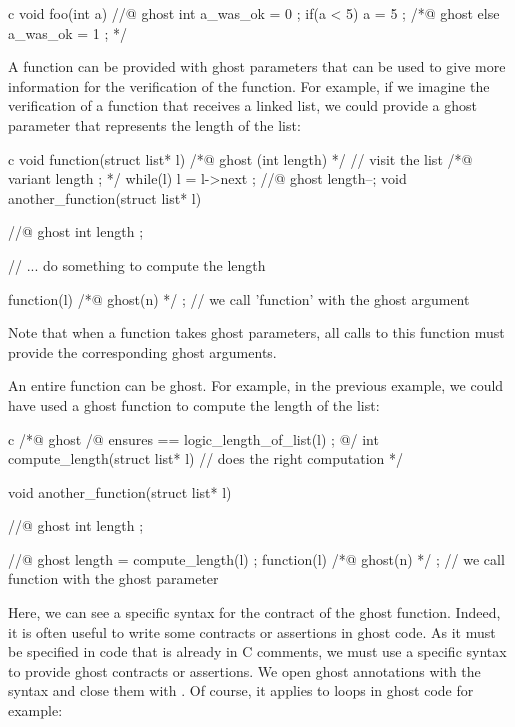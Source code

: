 \begin{CodeBlock}{c}
void foo(int a){
  //@ ghost int a_was_ok = 0 ;
  if(a < 5){
    a = 5 ;
  } /*@ ghost else {
    a_was_ok = 1 ;
  } */
}
\end{CodeBlock}


A function can be provided with ghost parameters that can be used
to give more information for the verification of the function. For
example, if we imagine the verification of a function that receives
a linked list, we could provide a ghost parameter that represents
the length of the list:


\begin{CodeBlock}{c}
void function(struct list* l) /*@ ghost (int length) */ {
  // visit the list
  /*@ variant length ; */
  while(l){
    l = l->next ;
    //@ ghost length--;
  }
}
void another_function(struct list* l){
  //@ ghost int length ;

  // ... do something to compute the length

  function(l) /*@ ghost(n) */ ; // we call 'function' with the ghost argument
}
\end{CodeBlock}


Note that when a function takes ghost parameters, all calls to this
function must provide the corresponding ghost arguments.


An entire function can be ghost. For example, in the previous example, we
could have used a ghost function to compute the length of the list:


\begin{CodeBlock}{c}
/*@ ghost
  /@ ensures \result == logic_length_of_list(l) ; @/
  int compute_length(struct list* l){
    // does the right computation
  }
*/

void another_function(struct list* l){
  //@ ghost int length ;

  //@ ghost length = compute_length(l) ;
  function(l) /*@ ghost(n) */ ; // we call function with the ghost parameter
}
\end{CodeBlock}


Here, we can see a specific syntax for the contract of the ghost function.
Indeed, it is often useful to write some contracts or assertions in ghost
code. As it must be specified in code that is already in C comments, we
must use a specific syntax to provide ghost contracts or assertions.
We open ghost annotations with the syntax  and close
them with . Of course, it applies to loops in ghost code
for example:


